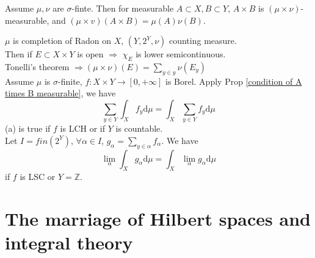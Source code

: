 \begin{proposition}\label{condition of A times B measurable}
    Assume  $ \mu,\nu  $ are  $ \sigma  $-finte. Then for measurable  $ A\subset X, B\subset Y $,  $ A\times B      $  is  $ (\mu\times\nu) $-measurable, and  $ (\mu\times v)(A\times B)=\mu(A)\nu(B) $.  
\end{proposition}
\begin{example}
     $ \mu  $ is completion of Radon on  $ X  $,  $ (Y,2^Y,\nu ) $ counting measure.\\
     Then if  $ E\subset X\times Y  $ is open  $ \Rightarrow  $  $ \chi_E $ is lower semicontinuous. \\
      Tonelli's theorem  $ \Rightarrow (\mu\times\nu)(E)=\sum\limits_{y\in y}\nu(E_y) $\\
      Assume  $ \mu  $ is   $ \sigma  $-finite,  $ f:X\times Y\rightarrow [0,+\infty ] $ is Borel. Apply Prop \ref{condition of A times B measurable}, we have 
      \[\sum\limits_{y\in Y}\int_X f_y\mathrm{d}\mu=\int_X\sum\limits_{y\in Y}f_y\mathrm{d}\mu\tag{a}\]
      (a) is true if  $ f  $ is LCH or if  $ Y  $ is countable.\\
      Let  $ I=fin(2^Y) $,  $ \forall \alpha\in I $,  $ g_\alpha=\sum\limits_{y\in \alpha}f_\alpha $. We have
      \[\lim\limits_{\alpha}\int_{X}g_\alpha\mathrm{d}\mu =\int_X\lim\limits_\alpha g_\alpha \mathrm{d}\mu\]  
      if  $ f  $ is LSC or  $ Y =\mathbb{Z} $. 
\end{example}
\section{The marriage of Hilbert spaces and integral theory}
